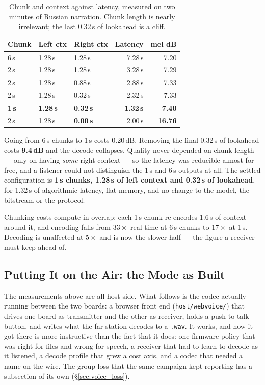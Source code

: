 \begin{table}[H]
    \centering
    \caption{Chunk and context against latency, measured on two minutes
             of Russian narration.  Chunk length is nearly irrelevant;
             the last 0.32\,s of lookahead is a cliff.}
    \label{tab:voice_latency}
    \small
    \begin{tabular}{@{}lllrr@{}}
    \toprule
    \textbf{Chunk} & \textbf{Left ctx} & \textbf{Right ctx} &
    \textbf{Latency} & \textbf{mel dB} \\
    \midrule
    6\,s & 1.28\,s & 1.28\,s & 7.28\,s &  7.20 \\
    2\,s & 1.28\,s & 1.28\,s & 3.28\,s &  7.29 \\
    2\,s & 1.28\,s & 0.88\,s & 2.88\,s &  7.33 \\
    2\,s & 1.28\,s & 0.32\,s & 2.32\,s &  7.33 \\
    \textbf{1\,s} & \textbf{1.28\,s} & \textbf{0.32\,s} &
        \textbf{1.32\,s} & \textbf{7.40} \\
    2\,s & 1.28\,s & \textbf{0.00\,s} & 2.00\,s & \textbf{16.76} \\
    \bottomrule
    \end{tabular}
\end{table}

Going from 6\,s chunks to 1\,s costs 0.20\,dB.  Removing the final
0.32\,s of lookahead costs \textbf{9.4\,dB} and the decode collapses.
Quality never depended on chunk length --- only on having \emph{some}
right context --- so the latency was reducible almost for free, and a
listener could not distinguish the 1\,s and 6\,s outputs at all.  The
settled configuration is \textbf{1\,s chunks, 1.28\,s of left context
and 0.32\,s of lookahead}, for 1.32\,s of algorithmic latency, flat
memory, and no change to the model, the bitstream or the protocol.

Chunking costs compute in overlap: each 1\,s chunk re-encodes 1.6\,s of
context around it, and encoding falls from $33\times$ real time at 6\,s
chunks to $17\times$ at 1\,s.  Decoding is unaffected at $5\times$ and is
now the slower half --- the figure a receiver must keep ahead of.

\subsection{Putting It on the Air: the Mode as Built}
\label{sec:voice_onair}

The measurements above are all host-side.  What follows is the codec
actually running between the two boards: a browser front end
(\texttt{host/webvoice/}) that drives one board as transmitter and the
other as receiver, holds a push-to-talk button, and writes what the far
station decodes to a \texttt{.wav}.  It works, and how it got there is
more instructive than the fact that it does: one firmware policy that
was right for files and wrong for speech, a receiver that had to learn
to decode as it listened, a decode profile that grew a cost axis, and a
codec that needed a name on the wire.  The group loss that the same
campaign kept reporting has a subsection of its own
(\S\ref{sec:voice_loss}).

